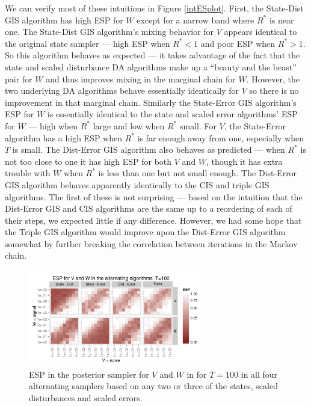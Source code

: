 \documentclass{article}
\begin{document}
We can verify most of these intuitions in Figure \ref{intESplot}. First, the State-Dist GIS algorithm has high ESP for $W$ except for a narrow band where $R^*$ is near one. The State-Dist GIS algorithm's mixing behavior for $V$ appears identical to the original state sampler --- high ESP when $R^* < 1$ and poor ESP when $R^* > 1$. So this algorithm behaves as expected --- it takes advantage of the fact that the state and scaled disturbance DA algorithms make up a ``beauty and the beast'' pair for $W$ and thus improves mixing in the marginal chain for $W$. However, the two underlying DA algorithms behave essentially identically for $V$ so there is no improvement in that marginal chain. Similarly the State-Error GIS algorithm's ESP for $W$ is essentially identical to the state and scaled error algorithms' ESP for $W$ --- high when $R^*$ large and low when $R^*$ small. For $V$, the State-Error algorithm has a high ESP when $R^*$ is far enough away from one, especially when $T$ is small. The Dist-Error GIS algorithm also behaves as predicted --- when $R^*$ is not too close to one it has high ESP for both $V$ and $W$, though it has extra trouble with $W$ when $R^*$ is less than one but not small enough. The Dist-Error GIS algorithm behaves apparently identically to the CIS and triple GIS algorithms. The first of these is not surprising --- based on the intuition that the Dist-Error GIS and CIS algorithms are the same up to a reordering of each of their steps, we expected little if any difference. However, we had some hope that the Triple GIS algorithm would improve upon the Dist-Error GIS algorithm somewhat by further breaking the correlation between iterations in the Markov chain. 

\begin{figure}[!ht]
\centering
\includegraphics[width=0.7\textwidth]{altESplot1}
\caption{ESP in the posterior sampler for $V$ and $W$ in for $T=100$ in all four alternating samplers based on any two or three of the states, scaled disturbances and scaled errors.}
\label{altESplot}
\end{figure}
\end{document}
